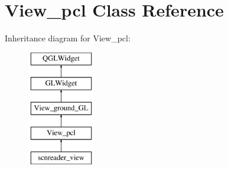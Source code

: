 \hypertarget{classView__pcl}{\section{View\-\_\-pcl Class Reference}
\label{classView__pcl}
}
Inheritance diagram for View\-\_\-pcl\-:\begin{figure}[H]
\begin{center}
\leavevmode
\includegraphics[height=5.000000cm]{classView__pcl}
\end{center}
\end{figure}
